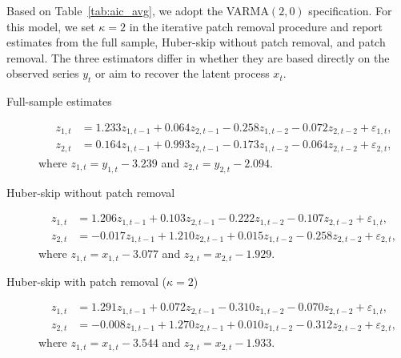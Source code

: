 \documentclass[12pt]{article}
\numberwithin{equation}{section}
\begin{document}
Based on Table~\ref{tab:aic_avg}, we adopt the VARMA$(2,0)$ specification. For this model, we set $\kappa=2$ in the iterative patch removal procedure and report estimates from the full sample, Huber-skip without patch removal, and patch removal.
The three estimators differ in whether they are based directly on the observed series $y_t$ or aim to recover the latent process $x_t$.
\begin{description}

\item[Full-sample estimates]
\begin{equation}
\begin{aligned}
z_{1, t} &= 1.233 z_{1, t-1} + 0.064 z_{2, t-1} - 0.258 z_{1, t-2} - 0.072 z_{2, t-2} + \varepsilon_{1, t}, \\
z_{2, t} &= 0.164 z_{1, t-1} + 0.993 z_{2, t-1} - 0.173 z_{1, t-2} - 0.064 z_{2, t-2} + \varepsilon_{2, t},
\end{aligned}
\end{equation}
where $z_{1, t} = y_{1, t} - 3.239$ and $z_{2, t} = y_{2, t} - 2.094$.

\item[Huber-skip without patch removal]
\begin{equation}
\begin{aligned}
z_{1, t} &= 1.206 z_{1, t-1} + 0.103 z_{2, t-1} - 0.222 z_{1, t-2} - 0.107 z_{2, t-2} + \varepsilon_{1, t}, \\
z_{2, t} &= -0.017 z_{1, t-1} + 1.210 z_{2, t-1} + 0.015 z_{1, t-2} - 0.258 z_{2, t-2} + \varepsilon_{2, t},
\end{aligned}
\end{equation}
where $z_{1, t} = x_{1, t} - 3.077$ and $z_{2, t} = x_{2, t} - 1.929$.

\item[Huber-skip with patch removal ($\kappa = 2$)]
\begin{equation}
\begin{aligned}
z_{1, t} &= 1.291 z_{1, t-1} + 0.072 z_{2, t-1} - 0.310 z_{1, t-2} - 0.070 z_{2, t-2} + \varepsilon_{1, t}, \\
z_{2, t} &= -0.008 z_{1, t-1} + 1.270 z_{2, t-1} + 0.010 z_{1, t-2} - 0.312 z_{2, t-2} + \varepsilon_{2, t},
\end{aligned}
\end{equation}
where $z_{1, t} = x_{1, t} - 3.544$ and $z_{2, t} = x_{2, t} - 1.933$.

\end{description}
\end{document}
